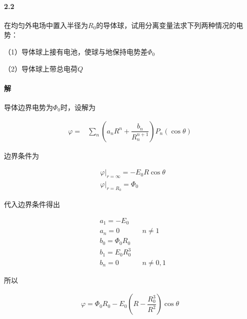 \documentclass{article}
\begin{document}
\paragraph{2.2}

在均匀外电场中置入半径为$R_0$的导体球，试用分离变量法求下列两种情况的电势：

（1）导体球上接有电池，使球与地保持电势差$\Phi_0$

（2）导体球上带总电荷$Q$

\paragraph{解}

导体边界电势为$\Phi_0$时，设解为

\begin{equation*}
  \begin{aligned}
    \varphi =
    & \sum_n \left( a_n R^n + \dfrac{b_n}{R_n^{n+1}} \right) P_n \left( \cos \theta \right)
  \end{aligned}
\end{equation*}

边界条件为

\begin{equation*}
  \begin{aligned}
    & \left. \varphi \right|_{r= \infty} = - E_0 R \cos \theta \\
    & \left. \varphi \right|_{r=R_0} = \Phi_0
  \end{aligned}
\end{equation*}

代入边界条件得出

\begin{equation*}
  \begin{aligned}
    &a_1= - E_0 && \\
    &a_n = 0 && n \neq 1 \\
    &b_0 = \Phi_0 R_0 &&\\
    &b_1 = E_0 R_0^3 &&\\
    &b_n = 0 && n \neq 0,1
  \end{aligned}
\end{equation*}

所以

\begin{equation*}
  \begin{aligned}
    \varphi = \Phi_0 R_0 - E_0 \left( R - \dfrac{R_0^3}{R^2}  \right) \cos \theta
  \end{aligned}
\end{equation*}
\end{document}
